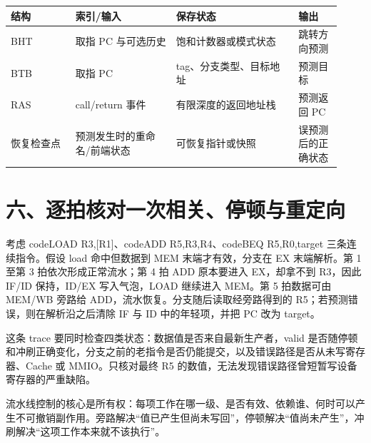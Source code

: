 \begin{longtable}{L{0.18\linewidth}L{0.28\linewidth}L{0.34\linewidth}L{0.12\linewidth}}
\toprule
结构 & 索引/输入 & 保存状态 & 输出 \\
\midrule
BHT & 取指 PC 与可选历史 & 饱和计数器或模式状态 & 跳转方向预测 \\\tablerowrule
BTB & 取指 PC & tag、分支类型、目标地址 & 预测目标 \\\tablerowrule
RAS & call/return 事件 & 有限深度的返回地址栈 & 预测返回 PC \\\tablerowrule
恢复检查点 & 预测发生时的重命名/前端状态 & 可恢复指针或快照 & 误预测后的正确状态 \\
\bottomrule
\end{longtable}

\section{六、逐拍核对一次相关、停顿与重定向}

考虑 code{LOAD R3,[R1]}、code{ADD R5,R3,R4}、code{BEQ R5,R0,target} 三条连续指令。假设 load 命中但数据到 MEM 末端才有效，分支在 EX 末端解析。第 1 至第 3 拍依次形成正常流水；第 4 拍 ADD 原本要进入 EX，却拿不到 R3，因此 IF/ID 保持，ID/EX 写入气泡，LOAD 继续进入 MEM。第 5 拍数据可由 MEM/WB 旁路给 ADD，流水恢复。分支随后读取经旁路得到的 R5；若预测错误，则在解析沿之后清除 IF 与 ID 中的年轻项，并把 PC 改为 target。

这条 trace 要同时检查四类状态：数据值是否来自最新生产者，valid 是否随停顿和冲刷正确变化，分支之前的老指令是否仍能提交，以及错误路径是否从未写寄存器、Cache 或 MMIO。只核对最终 R5 的数值，无法发现错误路径曾短暂写设备寄存器的严重缺陷。

\begin{keyidea}
流水线控制的核心是所有权：每项工作在哪一级、是否有效、依赖谁、何时可以产生不可撤销副作用。旁路解决“值已产生但尚未写回”，停顿解决“值尚未产生”，冲刷解决“这项工作本来就不该执行”。
\end{keyidea}




























